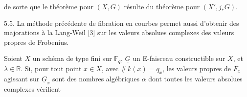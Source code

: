 \begin{center}
\end{center}

de sorte que le théorème pour $(X,G)$ résulte du théorème pour $(X',j_*G)$.

5.5. La méthode précédente de fibration en courbes permet aussi d'obtenir des majorations à la Lang-Weil [3] sur les valeurs absolues complexes des valeurs propres de Frobenius.

Soient $X$ un schéma de type fini sur $\mathbb{F}_q$, $\underline{G}$ un E-faisceau constructible sur $X$, et $\lambda \in \mathbb{R}$. Si, pour tout point $x \in X$, avec $\#\, k(x) = q_x$, les valeurs propres de $F_x$ agissant sur $\underline{G}_x$ sont des nombres algébriques $\alpha$ dont toutes les valeurs absolues complexes vérifient

